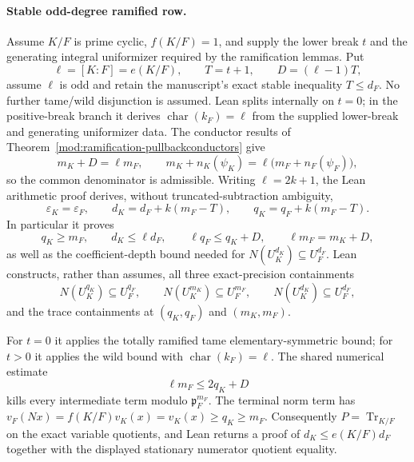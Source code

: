 \begin{theorem}
\paragraph{Stable odd-degree ramified row.}
Assume $K/F$ is prime cyclic, $f(K/F)=1$, and supply the lower break $t$ and
the generating integral uniformizer required by the ramification lemmas.
Put
\[
 \ell=[K:F]=e(K/F),\qquad T=t+1,\qquad
 D=(\ell-1)T,
\]
assume $\ell$ is odd and retain the manuscript's exact stable inequality
$T\leq d_F$.  No further tame/wild disjunction is assumed.  Lean splits
internally on $t=0$; in the positive-break branch it derives
$\operatorname{char}(k_F)=\ell$ from the supplied lower-break and generating
uniformizer data.
The conductor results of Theorem~\ref{mod:ramification-pullbackconductors}
give
\[
 m_K+D=\ell m_F,
 \qquad
 m_K+n_K(\psi_K)=\ell\bigl(m_F+n_F(\psi_F)\bigr),
\]
so the common denominator is admissible.  Writing $\ell=2k+1$, the Lean
arithmetic proof derives, without truncated-subtraction ambiguity,
\[
 \varepsilon_K=\varepsilon_F,\qquad
 d_K=d_F+k(m_F-T),\qquad
 q_K=q_F+k(m_F-T).
\]
In particular it proves
\[
 q_K\geq m_F,\qquad d_K\leq\ell d_F,\qquad
 \ell q_F\leq q_K+D,\qquad
 \ell m_F=m_K+D,
\]
as well as the coefficient-depth bound needed for
$N(U_K^{d_K})\subseteq U_F^{d_F}$.  Lean constructs, rather than assumes,
all three exact-precision containments
\[
 N(U_K^{q_K})\subseteq U_F^{q_F},\qquad
 N(U_K^{m_K})\subseteq U_F^{m_F},\qquad
 N(U_K^{d_K})\subseteq U_F^{d_F},
\]
and the trace containments at $(q_K,q_F)$ and $(m_K,m_F)$.

For $t=0$ it applies the totally ramified tame elementary-symmetric bound;
for $t>0$ it applies the wild bound with
$\operatorname{char}(k_F)=\ell$.  The shared numerical estimate
\[
 \ell m_F\leq2q_K+D
\]
kills every intermediate term modulo $\mathfrak p_F^{m_F}$.  The terminal
norm term has $v_F(Nx)=f(K/F)v_K(x)=v_K(x)\geq q_K\geq m_F$.
Consequently $P=\operatorname{Tr}_{K/F}$ on the exact variable quotients,
and Lean returns a proof of $d_K\leq e(K/F)d_F$ together with the displayed
stationary numerator quotient equality.


\end{theorem}
